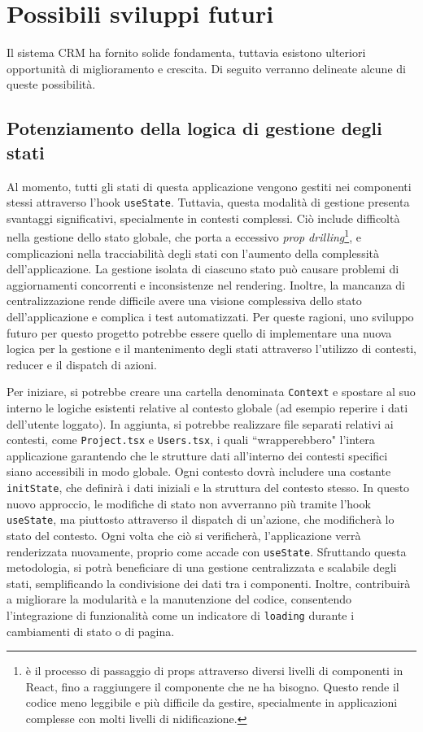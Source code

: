 \documentclass[target=bach,aauheader=,style=]{thud}
\begin{document}
\section{Possibili sviluppi futuri}
Il sistema CRM ha fornito solide fondamenta, tuttavia esistono ulteriori opportunità di miglioramento e crescita. Di seguito verranno delineate alcune di queste possibilità.

\subsection{Potenziamento della logica di gestione degli stati}
Al momento, tutti gli stati di questa applicazione vengono gestiti nei componenti stessi attraverso l'hook \texttt{useState}. Tuttavia, questa modalità di gestione presenta svantaggi significativi, specialmente in contesti complessi. Ciò include difficoltà nella gestione dello stato globale, che porta a eccessivo \textit{prop drilling}\footnote{è il processo di passaggio di props attraverso diversi livelli di componenti in React, fino a raggiungere il componente che ne ha bisogno. Questo rende il codice meno leggibile e più difficile da gestire, specialmente in applicazioni complesse con molti livelli di nidificazione.}, e complicazioni nella tracciabilità degli stati con l'aumento della complessità dell'applicazione. La gestione isolata di ciascuno stato può causare problemi di aggiornamenti concorrenti e inconsistenze nel rendering. Inoltre, la mancanza di centralizzazione rende difficile avere una visione complessiva dello stato dell'applicazione e complica i test automatizzati. Per queste ragioni, uno sviluppo futuro per questo progetto potrebbe essere quello di implementare una nuova logica per la gestione e il mantenimento degli stati attraverso l'utilizzo di contesti, reducer e il dispatch di azioni. 

\noindent Per iniziare, si potrebbe creare una cartella denominata \texttt{Context} e spostare al suo interno le logiche esistenti relative al contesto globale (ad esempio reperire i dati dell'utente loggato). In aggiunta, si potrebbe realizzare file separati relativi ai contesti, come \texttt{Project.tsx} e \texttt{Users.tsx}, i quali ``wrapperebbero" l'intera applicazione garantendo che le strutture dati all'interno dei contesti specifici siano accessibili in modo globale. Ogni contesto dovrà includere una costante \texttt{initState}, che definirà i dati iniziali e la struttura del contesto stesso. In questo nuovo approccio, le modifiche di stato non avverranno più tramite l'hook \texttt{useState}, ma piuttosto attraverso il dispatch di un'azione, che modificherà lo stato del contesto. Ogni volta che ciò si verificherà, l'applicazione verrà renderizzata nuovamente, proprio come accade con \texttt{useState}. Sfruttando questa metodologia, si potrà beneficiare di una gestione centralizzata e scalabile degli stati, semplificando la condivisione dei dati tra i componenti. Inoltre, contribuirà a migliorare la modularità e la manutenzione del codice, consentendo l'integrazione di funzionalità come un indicatore di \texttt{loading} durante i cambiamenti di stato o di pagina.
\end{document}
